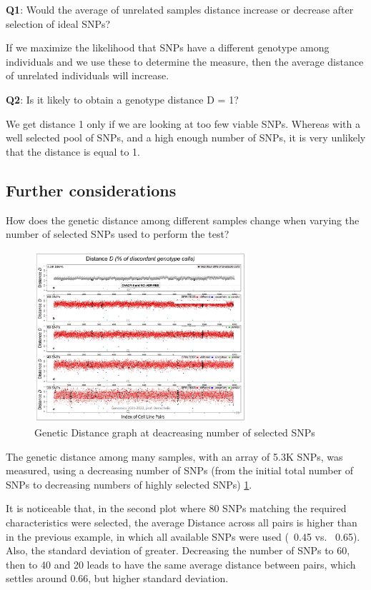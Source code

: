 \textbf{Q1}: Would the average of unrelated samples distance increase or decrease after selection of ideal SNPs?

If we maximize the likelihood that SNPs have a different genotype among individuals and we use these to determine the measure, then the average distance of unrelated individuals will increase.

\textbf{Q2}: Is it likely to obtain a genotype distance D = 1?

We get distance 1 only if we are looking at too few viable SNPs. Whereas with a well selected pool of SNPs, and a high enough number of SNPs, it is very unlikely that the distance is equal to 1.

\subsection*{Further considerations}
How does the genetic distance among different samples change when varying the number of selected SNPs used to perform the test?

\begin{figure}
	\centering
	\includegraphics[width=0.7\textwidth]{Selected_SNP.PNG}
	\caption{\label{fig:sel_snp}Genetic Distance graph at deacreasing number of selected SNPs}
\end{figure}

The genetic distance among many samples, with an array of 5.3K SNPs, was measured, using a decreasing number of SNPs (from the initial total number of SNPs to decreasing numbers of highly selected SNPs) \ref{fig:sel_snp}. 

It is noticeable that, in the second plot where 80 SNPs matching the required characteristics were selected, the average Distance across all pairs is higher than in the previous example, in which all available SNPs were used (~0.45 vs. ~0.65). Also, the standard deviation of greater. 
Decreasing the number of SNPs to 60, then to 40 and 20 leads to have the same average distance between pairs, which settles around 0.66, but higher standard deviation.

